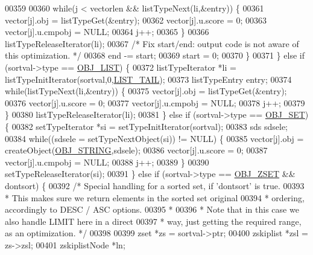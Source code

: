 \begin{DoxyCode}
00359 
00360             \textcolor{keywordflow}{while}(j < vectorlen && listTypeNext(li,&entry)) \{
00361                 vector[j].obj = listTypeGet(&entry);
00362                 vector[j].u.score = 0;
00363                 vector[j].u.cmpobj = NULL;
00364                 j++;
00365             \}
00366             listTypeReleaseIterator(li);
00367             \textcolor{comment}{/* Fix start/end: output code is not aware of this optimization. */}
00368             end -= start;
00369             start = 0;
00370         \}
00371     \} \textcolor{keywordflow}{else} \textcolor{keywordflow}{if} (sortval->type == \hyperlink{server_8h_a4a5f22a280949c97a0cb0d4213275126}{OBJ\_LIST}) \{
00372         listTypeIterator *li = listTypeInitIterator(sortval,0,\hyperlink{server_8h_a745de98bef5b645df56479181803235b}{LIST\_TAIL});
00373         listTypeEntry entry;
00374         \textcolor{keywordflow}{while}(listTypeNext(li,&entry)) \{
00375             vector[j].obj = listTypeGet(&entry);
00376             vector[j].u.score = 0;
00377             vector[j].u.cmpobj = NULL;
00378             j++;
00379         \}
00380         listTypeReleaseIterator(li);
00381     \} \textcolor{keywordflow}{else} \textcolor{keywordflow}{if} (sortval->type == \hyperlink{server_8h_a8d179375a4aac33d3fa7aa80c8ccc75f}{OBJ\_SET}) \{
00382         setTypeIterator *si = setTypeInitIterator(sortval);
00383         sds sdsele;
00384         \textcolor{keywordflow}{while}((sdsele = setTypeNextObject(si)) != NULL) \{
00385             vector[j].obj = createObject(\hyperlink{server_8h_a65236ea160f69cdef33ec942092af88f}{OBJ\_STRING},sdsele);
00386             vector[j].u.score = 0;
00387             vector[j].u.cmpobj = NULL;
00388             j++;
00389         \}
00390         setTypeReleaseIterator(si);
00391     \} \textcolor{keywordflow}{else} \textcolor{keywordflow}{if} (sortval->type == \hyperlink{server_8h_a8c356422ddbc03bd77694880a30a1953}{OBJ\_ZSET} && dontsort) \{
00392         \textcolor{comment}{/* Special handling for a sorted set, if 'dontsort' is true.}
00393 \textcolor{comment}{         * This makes sure we return elements in the sorted set original}
00394 \textcolor{comment}{         * ordering, accordingly to DESC / ASC options.}
00395 \textcolor{comment}{         *}
00396 \textcolor{comment}{         * Note that in this case we also handle LIMIT here in a direct}
00397 \textcolor{comment}{         * way, just getting the required range, as an optimization. */}
00398 
00399         zset *zs = sortval->ptr;
00400         zskiplist *zsl = zs->zsl;
00401         zskiplistNode *ln;

\end{DoxyCode}
